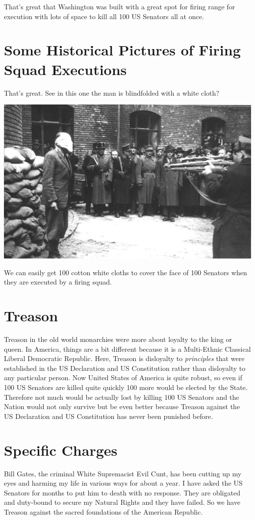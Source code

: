 \documentclass{amsart}
\begin{document}
That's great that Washington was built with a great spot for firing range for execution with lots of space to kill all 100 US Senators all at once.

\section{Some Historical Pictures of Firing Squad Executions}

That's great.  See in this one the man is blindfolded with a white cloth?

\includegraphics[scale=0.6]{firingsquad.jpg}

We can easily get 100 cotton white cloths to cover the face of 100 Senators when they are executed by a firing squad.

\section{Treason}

Treason in the old world monarchies were more about loyalty to the king or queen.  In America, things are a bit different because it is a Multi-Ethnic Classical Liberal Democratic Republic.  Here, Treason is disloyalty to {\em principles} that were established in the US Declaration and US Constitution rather than disloyalty to any particular person.  Now United States of America is quite robust, so even if 100 US Senators are killed quite quickly 100 more would be elected by the State.  Therefore not much would be actually lost by killing 100 US Senators and the Nation would not only survive but be even better because Treason against the US Declaration and US Constitution has never been punished before.

\section{Specific Charges}

Bill Gates, the criminal White Supremacist Evil Cunt, has been cutting up my eyes and harming my life in various ways for about a year.  I have asked the US Senators for months to put him to death with no response.  They are obligated and duty-bound to secure my Natural Rights and they have failed.  So we have Treason against the sacred foundations of the American Republic.
\end{document}
